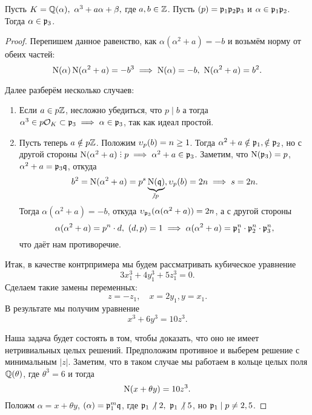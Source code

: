 	   

	  \begin{statement}[ДЗ 11, задача 3]\label{prop-alpha} 
	  	Пусть $K = \mathbb{Q}(\alpha), \ \alpha^3 + a \alpha + \beta,$ где $a, b \in \mathbb{Z}$. Пусть $(p) = \mathfrak{p}_1 \mathfrak{p}_2 \mathfrak{p}_3$ и $\alpha \in \mathfrak{p}_1 \mathfrak{p}_2$. Тогда $\alpha \in \mathfrak{p}_3$.
	  \end{statement}
	  \begin{proof}
	  	Перепишем данное равенство, как $\alpha(\alpha^2 + a) = - b$ и возьмём норму от обеих частей: 
	  	\[
	  		\operatorname{\mathrm{N}}(\alpha)\operatorname{\mathrm{N}}(\alpha^2 + a) = - b^3 \implies \operatorname{\mathrm{N}}(\alpha) = -b, \ \operatorname{\mathrm{N}}(\alpha^2 + a) = b^2. 
	  	\]

	  	Далее разберём несколько случаев: 
	  	\begin{enumerate}
	  		\item Если $a \in p\mathbb{Z}$, несложно убедиться, что $p \mid b$ а тогда $\alpha^3 \in p\mathcal{O}_{K} \subset \mathfrak{p}_{3} \implies \alpha \in \mathfrak{p}_{3}$, так как идеал простой. 

	  		\item Пусть теперь $a \notin p\mathbb{Z}$. Положим $\upsilon_{p}(b) = n \ge 1$. Тогда $\alpha^2 + a \notin \mathfrak{p}_1, \notin \mathfrak{p}_{2}$, но с другой стороны $\Nm(\alpha^2 + a) \divby p \implies \alpha^2 + a \in \fp_{3}$. Заметим, что $\operatorname{\mathrm{N}}(\mathfrak{p}_3) = p$, $\alpha^2 + a = \mathfrak{p}_{3} \mathfrak{q}$, откуда 
	  		\[
	  			b^2 = \Nm(\alpha^2 + a) = p^s \underbrace{\Nm(\fq)}_{\notdivby p}, \v_{p}(b) = 2n \implies s = 2n. 
	  		\]
	  		Тогда $\alpha(\alpha^2 + a) = -b$, откуда $\upsilon_{\mathfrak{p}_3}(\alpha(\alpha^2 + a)) = 2n$, а с другой стороны
	  		\[
	  		  	\alpha(\alpha^2 + a) = p^n \cdot d, \ (d, p ) = 1 \implies \alpha(\alpha^2 + a) = \mathfrak{p}_1^n \cdot \mathfrak{p}_2^n \cdot \mathfrak{p}_{3}^n,
	  		  \]  
	  		  что даёт нам противоречие. 
	  		
	  	\end{enumerate}




	  	Итак, в качестве контрпримера мы будем рассматривать кубическое уравнение 
	  	\[
	  		3x_1^3 + 4y_1^3 + 5z_1^3 = 0.
	  	\]
	  	Сделаем такие замены переменных: 
	  	\[
	  		z = -z_1, \quad x = 2y_1, y = x_1.
	  	\]
	  	В результате мы получим уравнение 
	  	\[
	  		x^3 + 6y^3 = 10z^3.
	  	\]

	  	Наша задача будет состоять в том, чтобы доказать, что оно не имеет нетривиальных целых решений. Предположим противное и выберем решение с минимальным $|z|$. Заметим, что в таком случае мы работаем в кольце целых поля $\mathbb{Q}(\theta)$, где $\theta^3 = 6$ и тогда 
	  	\[
	  		\operatorname{\mathrm{N}}(x + \theta y) = 10z^3.
	  	\]
	  	Положм $\alpha = x + \theta y$, $(\alpha) = \mathfrak{p}_1^m \mathfrak{q}$, где $\mathfrak{p}_1 \not\ \mid 2, \ \mathfrak{p}_1 \not\ \mid 5$, но $\mathfrak{p}_1 \mid p \neq 2, 5$.


\end{proof}
